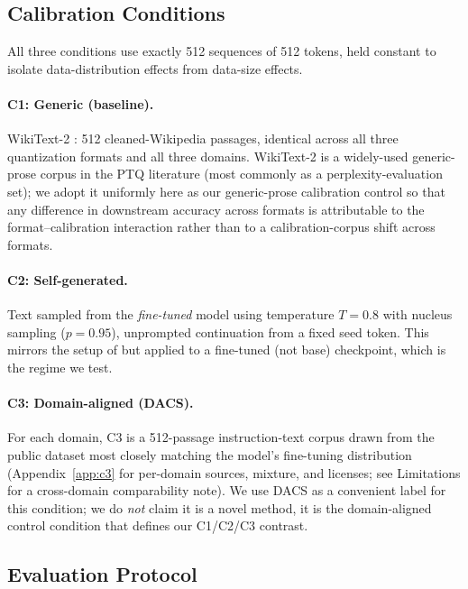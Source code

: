 \documentclass[11pt]{article}
\newcommand{\dacs}{DACS}
\begin{document}
\subsection{Calibration Conditions}
\label{sec:calib}

All three conditions use exactly 512 sequences of 512 tokens, held
constant to isolate data-distribution effects from data-size effects.

\paragraph{C1: Generic (baseline).}
WikiText-2 \citep{merity2017wikitext}: 512 cleaned-Wikipedia
passages, identical across all three quantization formats and all
three domains.  WikiText-2 is a widely-used generic-prose corpus
in the PTQ literature (most commonly as a perplexity-evaluation
set); we adopt it uniformly here as our generic-prose calibration
control so that any difference in downstream accuracy across
formats is attributable to the format--calibration interaction
rather than to a calibration-corpus shift across formats.

\paragraph{C2: Self-generated.}
Text sampled from the \emph{fine-tuned} model using temperature $T=0.8$
with nucleus sampling ($p=0.95$), unprompted continuation from a fixed
seed token.  This mirrors the setup of
\citet{williams2025selfcalib} but applied to a fine-tuned (not base)
checkpoint, which is the regime we test.

\paragraph{C3: Domain-aligned (\dacs{}).}
\begin{sloppypar}
For each domain, C3 is a 512-passage instruction-text corpus drawn
from the public dataset most closely matching the model's
fine-tuning distribution (Appendix~\ref{app:c3} for per-domain
sources, mixture, and licenses; see Limitations for a cross-domain
comparability note).  We use \dacs{} as a convenient label for this
condition; we do \emph{not} claim it is a novel method, it is the
domain-aligned control condition that defines our C1/C2/C3 contrast.
\end{sloppypar}

\subsection{Evaluation Protocol}
\label{sec:eval}
\end{document}
